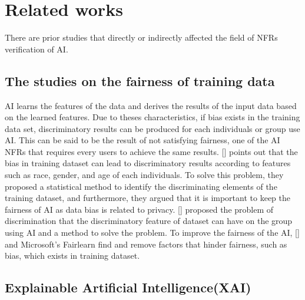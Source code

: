 \documentclass[journal,article,submit,moreauthors,pdftex]{Definitions/mdpi}
\begin{document}
\section{Related works} %

There are prior studies that directly or indirectly affected the field of NFRs verification of AI.


\subsection{The studies on the fairness of training data}

AI learns the features of the data and derives the results of the input data based on the learned features. Due to theses characteristics, if bias exists in the training data set, discriminatory results can be produced for each individuals or group use AI.
This can be said to be the result of not satisfying fairness, one of the AI NFRs that requires every users to achieve the same results.
[] points out that the bias in training dataset can lead to discriminatory results according to features such as race, gender, and age of each individuals.
To solve this problem, they proposed a statistical method to identify the discriminating elements of the training dataset, and furthermore, they argued that it is important to keep the fairness of AI as data bias is related to privacy.
[] proposed the problem of discrimination that the discriminatory feature of dataset can have on the group using AI and a method to solve the problem.
To improve the fairness of the AI, [] and Microsoft's Fairlearn find and remove factors that hinder fairness, such as bias, which exists in training dataset.

\subsection{Explainable Artificial Intelligence(XAI)}
\end{document}
